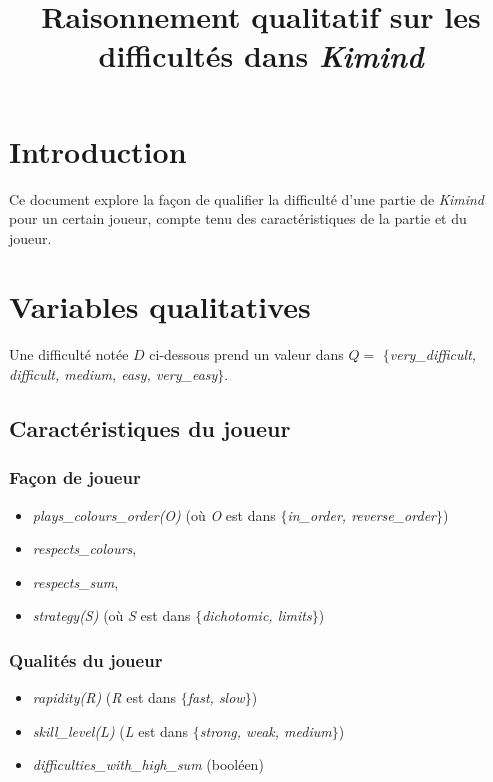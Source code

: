 \documentclass[a4paper, 12]{article}
\newcommand\acc[1]{$\{$\emph{#1}$\}$}
\begin{document}
\title{Raisonnement qualitatif sur les difficultés dans \emph{Kimind}}
\date{}
\maketitle

\section{Introduction}
Ce document explore la façon de qualifier la difficulté d’une partie de \emph{Kimind} pour un certain joueur, compte tenu des caractéristiques de la partie et du joueur.

\section{Variables qualitatives}

Une difficulté notée $D$ ci-dessous prend un valeur dans $Q = $ \acc{very\_difficult, difficult, medium, easy, very\_easy}.


\subsection{Caractéristiques du joueur}

\subsubsection*{Façon de joueur}

\begin{itemize}
\item \emph{plays\_colours\_order(O)} (où \emph{O} est dans \acc{in\_order, reverse\_order})
\item \emph{respects\_colours},
\item \emph{respects\_sum},
\item \emph{strategy(S)} (où \emph{S} est dans \acc{dichotomic, limits})
\end{itemize}


\subsubsection*{Qualités du joueur}
\begin{itemize}
	\item \emph{rapidity(R)} (\emph{R} est dans \acc{fast,  slow})
	\item \emph{skill\_level(L)} (\emph{L} est dans \acc{strong, weak, medium})
	\item \emph{difficulties\_with\_high\_sum} (booléen)
\end{itemize}
\end{document}
